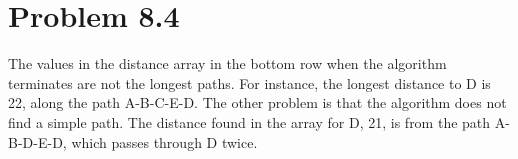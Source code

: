 \documentclass[12pt,letterpaper]{article}
\newcommand\hwnum{8}                  %
\newenvironment{answer}[1]{
  \section*{Problem \hwnum.#1}
}{\newpage}
\begin{document}
\begin{answer}{4}
The values in the distance array in the bottom row when the algorithm terminates are not the longest paths. For instance, the longest distance to D is 22, along the path A-B-C-E-D. The other problem is that the algorithm does not find a simple path. The distance found in the array for D, 21, is  from the path A-B-D-E-D, which passes through D twice.























\end{answer}
\end{document}
